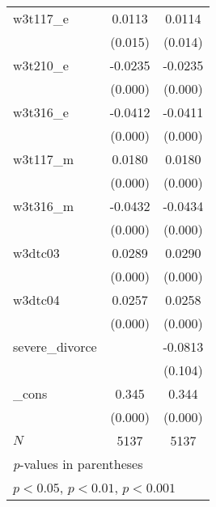 {\begin{tabular}{l*{2}{c}}
w3t117\_e    &      0.0113\sym{*}  &      0.0114\sym{*}  \\
            &     (0.015)         &     (0.014)         \\
[1em]
w3t210\_e    &     -0.0235\sym{***}&     -0.0235\sym{***}\\
            &     (0.000)         &     (0.000)         \\
[1em]
w3t316\_e    &     -0.0412\sym{***}&     -0.0411\sym{***}\\
            &     (0.000)         &     (0.000)         \\
[1em]
w3t117\_m    &      0.0180\sym{***}&      0.0180\sym{***}\\
            &     (0.000)         &     (0.000)         \\
[1em]
w3t316\_m    &     -0.0432\sym{***}&     -0.0434\sym{***}\\
            &     (0.000)         &     (0.000)         \\
[1em]
w3dtc03     &      0.0289\sym{***}&      0.0290\sym{***}\\
            &     (0.000)         &     (0.000)         \\
[1em]
w3dtc04     &      0.0257\sym{***}&      0.0258\sym{***}\\
            &     (0.000)         &     (0.000)         \\
[1em]
severe\_divorce&                     &     -0.0813         \\
            &                     &     (0.104)         \\
[1em]
\_cons      &       0.345\sym{***}&       0.344\sym{***}\\
            &     (0.000)         &     (0.000)         \\
\hline
\(N\)       &        5137         &        5137         \\
\hline\hline
\multicolumn{3}{l}{\footnotesize \textit{p}-values in parentheses}\\
\multicolumn{3}{l}{\footnotesize \sym{*} \(p<0.05\), \sym{**} \(p<0.01\), \sym{***} \(p<0.001\)}\\
\end{tabular}
}
